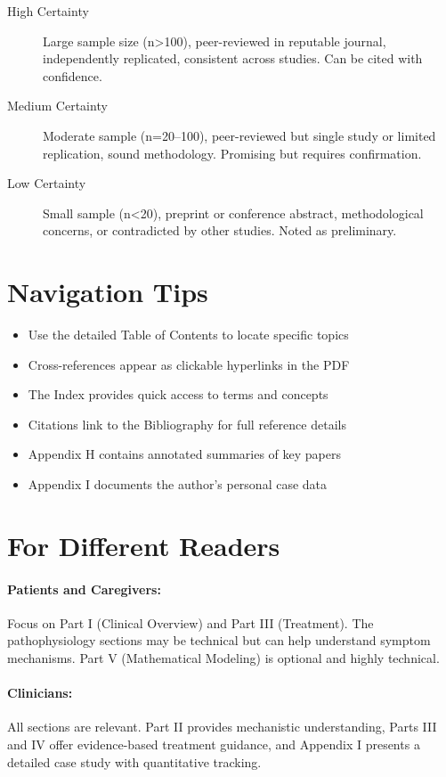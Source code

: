 \begin{description}
\item[High Certainty] Large sample size (n>100), peer-reviewed in reputable journal, independently replicated, consistent across studies. Can be cited with confidence.

\item[Medium Certainty] Moderate sample (n=20--100), peer-reviewed but single study or limited replication, sound methodology. Promising but requires confirmation.

\item[Low Certainty] Small sample (n<20), preprint or conference abstract, methodological concerns, or contradicted by other studies. Noted as preliminary.
\end{description}

\section*{Navigation Tips}

\begin{itemize}
\item Use the detailed Table of Contents to locate specific topics
\item Cross-references appear as clickable hyperlinks in the PDF
\item The Index provides quick access to terms and concepts
\item Citations link to the Bibliography for full reference details
\item Appendix H contains annotated summaries of key papers
\item Appendix I documents the author's personal case data
\end{itemize}

\section*{For Different Readers}

\paragraph{Patients and Caregivers:} Focus on Part I (Clinical Overview) and Part III (Treatment). The pathophysiology sections may be technical but can help understand symptom mechanisms. Part V (Mathematical Modeling) is optional and highly technical.

\paragraph{Clinicians:} All sections are relevant. Part II provides mechanistic understanding, Parts III and IV offer evidence-based treatment guidance, and Appendix I presents a detailed case study with quantitative tracking.

